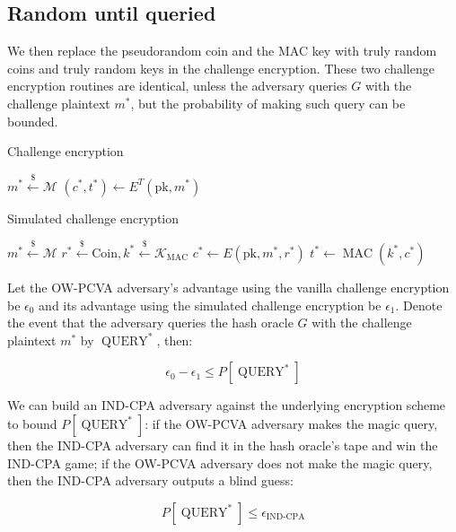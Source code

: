 \documentclass{article}
\newcommand{\leftsample}{\overset{{\scriptscriptstyle\$}}{\leftarrow}}
\begin{document}
\subsection{Random until queried}\label{random-until-queried}
We then replace the pseudorandom coin and the MAC key with truly random coins and truly random keys in the challenge encryption. These two challenge encryption routines are identical, unless the adversary queries $G$ with the challenge plaintext $m^\ast$, but the probability of making such query can be bounded.

\begin{multicols}{2}
    \begin{algorithm}[H]
        \SetAlgoLined
        \caption{Challenge encryption}
        $m^\ast \leftsample \mathcal{M}$\;
        $(c^\ast, t^\ast) \leftarrow E^T(\text{pk}, m^\ast)$\;
    \end{algorithm}

    \begin{algorithm}[H]
        \SetAlgoLined
        \caption{Simulated challenge encryption}
        $m^\ast \leftsample \mathcal{M}$\;
        $r^\ast \leftsample \text{Coin}, k^\ast \leftsample \mathcal{K}_\text{MAC}$\;
        $c^\ast \leftarrow E(\text{pk}, m^\ast, r^\ast)$\;
        $t^\ast \leftarrow \operatorname{MAC}(k^\ast, c^\ast)$
    \end{algorithm}
\end{multicols}

Let the OW-PCVA adversary's advantage using the vanilla challenge encryption be $\epsilon_0$ and its advantage using the simulated challenge encryption be $\epsilon_1$. Denote the event that the adversary queries the hash oracle $G$ with the challenge plaintext $m^\ast$ by $\operatorname{QUERY}^\ast$, then:

\begin{equation*}
    \epsilon_0 - \epsilon_1 \leq P[\operatorname{QUERY}^\ast]
\end{equation*}

We can build an IND-CPA adversary against the underlying encryption scheme to bound $P[\operatorname{QUERY}^\ast]$: if the OW-PCVA adversary makes the magic query, then the IND-CPA adversary can find it in the hash oracle's tape and win the IND-CPA game; if the OW-PCVA adversary does not make the magic query, then the IND-CPA adversary outputs a blind guess:

\begin{equation*}
    P[\operatorname{QUERY}^\ast] \leq \epsilon_\text{IND-CPA}
\end{equation*}
\end{document}
